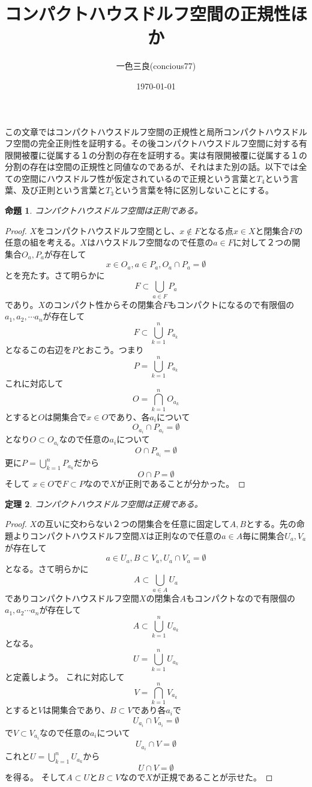 \documentclass{jsarticle}
\title{コンパクトハウスドルフ空間の正規性ほか}
\author{一色三良(concious77)}
\date{\today}
\newtheorem{thm}{定理}
\newtheorem{prop}[thm]{命題}
\begin{document}
\maketitle

この文章ではコンパクトハウスドルフ空間の正規性と局所コンパクトハウスドルフ空間の完全正則性を証明する。その後コンパクトハウスドルフ空間に対する有限開被覆に従属する１の分割の存在を証明する。実は有限開被覆に従属する１の分割の存在は空間の正規性と同値なのであるが、それはまた別の話。以下では全ての空間にハウスドルフ性が仮定されているので正規という言葉と$T_4$という言葉、及び正則という言葉と$T_3$という言葉を特に区別しないことにする。

\begin{prop}
コンパクトハウスドルフ空間は正則である。
\end{prop}

\begin{proof}$X$をコンパクトハウスドルフ空間とし、$x\not\in F$となる点$x\in X$と閉集合$F$の任意の組を考える。$X$はハウスドルフ空間なので任意の$a\in F$に対して２つの開集合$O_a,P_a$が存在して
\[
x\in O_a, a\in P_a,O_a\cap P_a=\emptyset
\]
とを充たす。さて明らかに
\[
F\subset \bigcup_{a\in F}P_a
\]
であり。$X$のコンパクト性からその閉集合$F$もコンパクトになるので有限個の$a_1,a_2,\cdots a_n$が存在して
\[
F\subset \bigcup_{k=1}^{n}P_{a_k}
\]
となるこの右辺を$P$とおこう。つまり
\[
P=\bigcup_{k=1}^{n}P_{a_k} 
\]
これに対応して
\[
O=\bigcap_{k=1}^{n}O_{a_k}
\]
とすると$O$は開集合で$x\in O$であり、各$a_i$について
\[
O_{a_i}\cap P_{a_i}=\emptyset
\]
となり$O\subset O_{a_i}$なので任意の$a_i$について
\[
O\cap P_{a_i}=\emptyset
\]
更に$P=\bigcup_{k=1}^{n}P_{a_k} $だから
\[
O\cap P=\emptyset
\]
そして
$x\in O$で$F\subset P$なので$X$が正則であることが分かった。

\end{proof}

\begin{thm}
コンパクトハウスドルフ空間は正規である。
\end{thm}
\begin{proof}
$X$の互いに交わらない２つの閉集合を任意に固定して$A,B$とする。先の命題よりコンパクトハウスドルフ空間$X$は正則なので任意の$a\in A$毎に開集合$U_a,V_a$が存在して
\[
a\in U_a, B\subset V_a,U_a\cap V_a=\emptyset
\]
となる。さて明らかに
\[
A\subset \bigcup_{a\in A}U_a
\]
でありコンパクトハウスドルフ空間$X$の閉集合$A$もコンパクトなので有限個の$a_1,a_2\cdots a_n$が存在して
\[
A\subset \bigcup_{k=1}^{n}U_{a_k}
\]
となる。
\[
U=\bigcup_{k=1}^{n}U_{a_k}
\]
と定義しよう。
これに対応して
\[
V=\bigcap_{k=1}^{n}V_{a_k}
\]
とすると$V$は開集合であり、$B\subset V$であり各$a_i$で
\[
U_{a_i}\cap V_{a_i}=\emptyset
\]
で$V\subset V_{a_i}なので$任意の$a_i$について
\[
U_{a_i}\cap V=\emptyset
\]
これと$U=\bigcup_{k=1}^{n}U_{a_k}$から
\[
U\cap V=\emptyset
\]
を得る。
そして$A\subset U$と$B\subset V$なので$X$が正規であることが示せた。
\end{proof}
\end{document}
